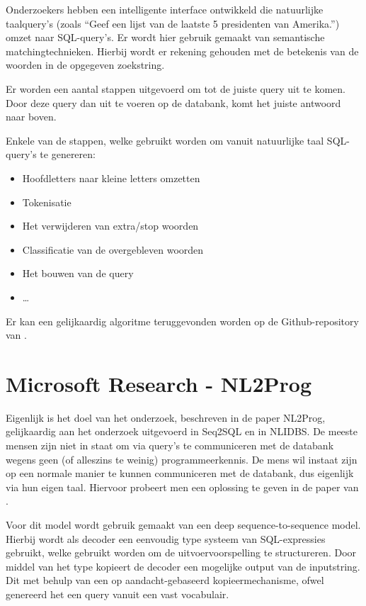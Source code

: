 Onderzoekers hebben een intelligente interface ontwikkeld die natuurlijke taalquery’s (zoals “Geef een lijst van de laatste 5 presidenten van Amerika.”) omzet naar SQL-query’s. Er wordt hier gebruik gemaakt van semantische matchingtechnieken. Hierbij wordt er rekening gehouden met de betekenis van de woorden in de opgegeven zoekstring. 

Er worden een aantal stappen uitgevoerd om tot de juiste query uit te komen. Door deze query dan uit te voeren op de databank, komt het juiste antwoord naar boven. 

Enkele van de stappen, welke gebruikt worden om vanuit natuurlijke taal SQL-query’s te genereren:

\begin{itemize}
\item Hoofdletters naar kleine letters omzetten
\item Tokenisatie
\item Het verwijderen van extra/stop woorden
\item Classificatie van de overgebleven woorden
\item Het bouwen van de query
\item \dots
\end{itemize}

Er kan een gelijkaardig algoritme teruggevonden worden op de Github-repository van \textcite{nlidb}.

\section{Microsoft Research - NL2Prog}

Eigenlijk is het doel van het onderzoek, beschreven in de paper NL2Prog, gelijkaardig aan het onderzoek uitgevoerd in Seq2SQL en in NLIDBS. De meeste mensen zijn niet in staat om via query's te communiceren met de databank wegens geen (of alleszins te weinig) programmeerkennis. De mens wil instaat zijn op een normale manier te kunnen communiceren met de databank, dus eigenlijk via hun eigen taal. Hiervoor probeert men een oplossing te geven in de paper van \textcite{nl2prog}.		

Voor dit model wordt gebruik gemaakt van een deep sequence-to-sequence model. Hierbij wordt als decoder een eenvoudig type systeem van SQL-expressies gebruikt, welke gebruikt worden om de uitvoervoorspelling te structureren. Door middel van het type kopieert de decoder een mogelijke output van de inputstring. Dit met behulp van een op aandacht-gebaseerd kopieermechanisme, ofwel genereerd het een query vanuit een vast vocabulair.

